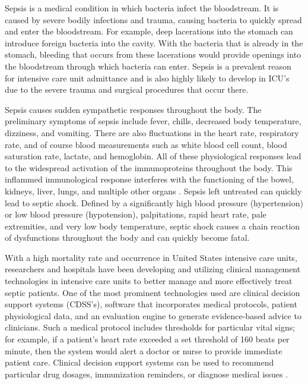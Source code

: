 \documentclass{sig-alternate}
\begin{document}
Sepsis is a medical condition in which bacteria infect the bloodstream. It is caused by severe bodily infections and trauma, causing bacteria to quickly spread and enter the bloodstream. For example, deep lacerations into the stomach can introduce foreign bacteria into the cavity. With the bacteria that is already in the stomach, bleeding that occurs from these lacerations would provide openings into the bloodstream through which bacteria can enter. Sepsis is a prevalent reason for intensive care unit admittance and is also highly likely to develop in ICU's due to the severe trauma and surgical procedures that occur there. 

Sepsis causes sudden sympathetic responses throughout the body. The preliminary symptoms of sepsis include fever, chills, decreased body temperature, dizziness, and vomiting. There are also fluctuations in the heart rate, respiratory rate, and of course blood measurements such as white blood cell count, blood saturation rate, lactate, and hemoglobin. All of these physiological responses lead to the widespread activation of the immunoproteins throughout the body. This inflammed immunological response interferes with the functioning of the bowel, kidneys, liver, lungs, and multiple other organs \cite{statins}. Sepsis left untreated can quickly lead to septic shock. Defined by a significantly high blood pressure (hypertension) or low blood pressure (hypotension), palpitations, rapid heart rate, pale extremities, and very low body temperature, septic shock causes a chain reaction of dysfunctions throughout the body and can quickly become fatal.

With a high mortality rate and occurrence in United States intensive care units, researchers and hospitals have been developing and utilizing clinical management technologies in intensive care units to better manage and more effectively treat septic patients. One of the most prominent technologies used are clinical decision support systems (CDSS's), software that incorporates medical protocols, patient physiological data, and an evaluation engine to generate evidence-based advice to clinicians. Such a medical protocol includes thresholds for particular vital signs; for example, if a patient's heart rate exceeded a set threshold of 160 beats per minute, then the system would alert a doctor or nurse to provide immediate patient care. Clinical decision support systems can be used to recommend particular drug dosages, immunization reminders, or diagnose medical issues \cite{ssc}. 
\end{document}
